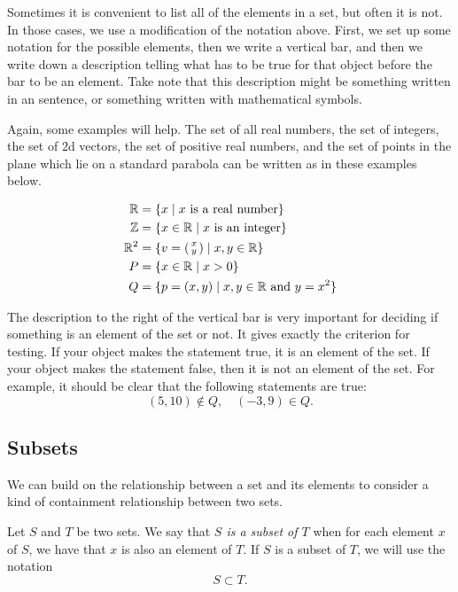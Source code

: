 \documentclass[elementsmain.tex]{subfiles}
\begin{document}
Sometimes it is convenient to list all of the elements in a set, but often it is not. In those cases, we use a modification of the notation above. First, we set up some notation for the possible elements, then we write a vertical bar, and then we write down a description telling what has to be true for that object before the bar to be an element. Take note that this description might be something written in an sentence, or something written with mathematical symbols. 

Again, some examples will help. The set of all real numbers, the set of integers, the set of $2$d vectors, the set of positive real numbers, and the set of points in the plane which lie on a standard parabola can be written as in these examples below.

\begin{align*}
\mathbb{R} & = \{ x \mid \text{$x$ is a real number} \} \\
\mathbb{Z} & = \{ x\in \mathbb{R} \mid \text{$x$ is an integer} \}\\
\mathbb{R}^2 &= \{ v = \left(\begin{smallmatrix} x\\y\end{smallmatrix}\right) \mid x, y \in \mathbb{R} \}\\
P & = \{x \in \mathbb{R} \mid x > 0 \} \\
Q & = \{ p = (x,y) \mid \text{$x, y \in \mathbb{R}$ and $y=x^2$} \}
\end{align*}


The description to the right of the vertical bar is very important for deciding if something is an element of the set or not. It gives exactly the criterion for testing. If your object makes the statement true, it is an element of the set. If your object makes the statement false, then it is not an element of the set. For example, it should be clear that the following statements are true:
\[
(5,10) \not\in Q, \quad (-3,9) \in Q.
\]


\subsection*{Subsets}

We can build on the relationship between a set and its elements to consider a kind of containment relationship between two sets.

\begin{definition} Let $S$ and $T$ be two sets. We say that \emph{$S$ is a subset of $T$} when for each element $x$ of $S$, we have that $x$ is also an element of $T$. If $S$ is a subset of $T$, we will use the notation
\[
S \subset T.
\]
\end{definition}
\end{document}
